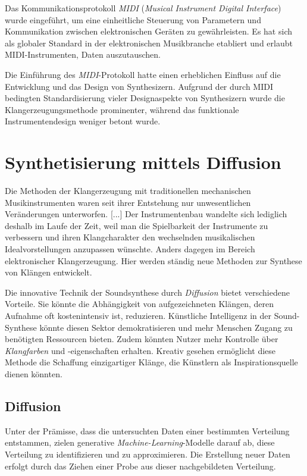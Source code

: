 \documentclass[
  a4paper,  %
  twoside,  %
  bibliography=totoc,
  headsepline,
  cleardoublepage=empty,
  parskip=half,
  draft=false
]{scrbook}
\begin{document}
{Das Kommunikationsprotokoll \emph{MIDI} (\emph{Musical Instrument Digital Interface}) \cite{midi_association_midi_nodate} wurde eingeführt, um eine einheitliche Steuerung von Parametern und Kommunikation zwischen elektronischen Geräten zu gewährleisten. Es hat sich als globaler Standard in der elektronischen Musikbranche etabliert und erlaubt MIDI-Instrumenten, Daten auszutauschen. \cite{ruschkowski_elektronische_2019}

Die Einführung des \emph{MIDI}-Protokoll hatte einen erheblichen Einfluss auf die Entwicklung und das Design von Synthesizern. Aufgrund der durch MIDI bedingten Standardisierung vieler Designaspekte von Synthesizern wurde die Klangerzeugungsmethode prominenter, während das funktionale Instrumentendesign weniger betont wurde. \cite{russ_sound_2009}

\section{Synthetisierung mittels Diffusion}

\glqq Die Methoden der Klangerzeugung mit traditionellen mechanischen Musikinstrumenten waren seit ihrer Entstehung nur unwesentlichen Veränderungen unterworfen. [...] Der Instrumentenbau wandelte sich lediglich deshalb im Laufe der Zeit, weil man die Spielbarkeit der Instrumente zu verbessern und ihren Klangcharakter den wechselnden musikalischen Idealvorstellungen anzupassen wünschte. Anders dagegen im Bereich elektronischer Klangerzeugung. Hier werden ständig neue Methoden zur Synthese von Klängen entwickelt.\grqq \, \cite{ruschkowski_elektronische_2019}

Die innovative Technik der Soundsynthese durch \emph{Diffusion} bietet verschiedene Vorteile. Sie könnte die Abhängigkeit von aufgezeichneten Klängen, deren Aufnahme oft kostenintensiv ist, reduzieren. Künstliche Intelligenz in der Sound-Synthese könnte diesen Sektor demokratisieren und mehr Menschen Zugang zu benötigten Ressourcen bieten. Zudem könnten Nutzer mehr Kontrolle über \emph{Klangfarben} und -eigenschaften erhalten. Kreativ gesehen ermöglicht diese Methode die Schaffung einzigartiger Klänge, die Künstlern als Inspirationsquelle dienen könnten. \cite{haohe_liu_audioldm_2023}


\subsection{Diffusion}
Unter der Prämisse, dass die untersuchten Daten einer bestimmten Verteilung entstammen, zielen generative \emph{Machine-Learning}-Modelle darauf ab, diese Verteilung zu identifizieren und zu approximieren. Die Erstellung neuer Daten erfolgt durch das Ziehen einer Probe aus dieser nachgebildeten Verteilung. \cite{machine_learning_at_berkeley_diffusion_2022}

}
\end{document}
